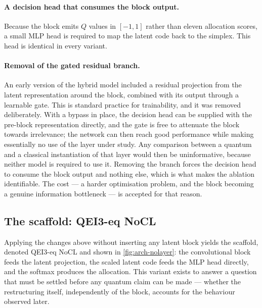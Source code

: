 \documentclass[aps,floatfix,superscriptaddress,twocolumn,tightenlines,amsmath,amssymb,nofootinbib,10pt,longbibliography,prl]{revtex4-2}
\begin{document}
\paragraph{A decision head that consumes the block output.}
Because the block emits $Q$ values in $[-1,1]$ rather than eleven allocation scores, a small MLP head is required to map the latent code back to the simplex. This head is identical in every variant.

\paragraph{Removal of the gated residual branch.}
An early version of the hybrid model included a residual projection from the latent representation around the block, combined with its output through a learnable gate. This is standard practice for trainability, and it was removed deliberately. With a bypass in place, the decision head can be supplied with the pre-block representation directly, and the gate is free to attenuate the block towards irrelevance; the network can then reach good performance while making essentially no use of the layer under study. Any comparison between a quantum and a classical instantiation of that layer would then be uninformative, because neither model is required to use it. Removing the branch forces the decision head to consume the block output and nothing else, which is what makes the ablation identifiable. The cost --- a harder optimisation problem, and the block becoming a genuine information bottleneck --- is accepted for that reason.

\subsection{The scaffold: QEI3-eq NoCL}
\label{subsec:arch-nolayer}

Applying the changes above without inserting any latent block yields the scaffold, denoted QEI3-eq NoCL and shown in \ref{fig:arch-nolayer}: the convolutional block feeds the latent projection, the scaled latent code feeds the MLP head directly, and the softmax produces the allocation. This variant exists to answer a question that must be settled before any quantum claim can be made --- whether the restructuring itself, independently of the block, accounts for the behaviour observed later.
\end{document}
